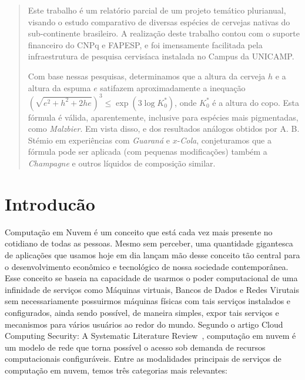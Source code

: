 \documentclass[11pt,twoside]{article}
\begin{document}
\begin{abstract} 
  Este trabalho é um relatório parcial de um projeto temático 
  plurianual, visando o estudo comparativo de diversas espécies de
  cervejas nativas do sub-continente brasileiro.  A realização deste
  trabalho contou com o suporte financeiro do CNPq e FAPESP, e foi
  imensamente facilitada pela infraestrutura de pesquisa cervisíaca
  instalada no Campus da UNICAMP.

  Com base nessas pesquisas, determinamos que a altura da cerveja $h$
  e a altura da espuma $e$ satifazem aproximadamente a inequação
  $(\sqrt{e^2 + h^2 + 2 h e})^3 \leq \exp(3 \log K_0^\ast)$, onde
  $K_0^\ast$ é a altura do copo.  Esta fórmula é válida,
  aparentemente, inclusive para espécies mais pigmentadas, como {\em
  Malzbier}.  Em vista disso, e dos resultados análogos obtidos por
  A. B. Stémio em experiências com {\em Guaraná} e $x$-{\em Cola},
  conjeturamos que a fórmula pode ser aplicada (com pequenas
  modificações) também a {\em Champagne} e outros líquidos de
  composição similar.
\end{abstract}

\section{Introducão}

Computação em Nuvem é um conceito que está cada vez mais presente no cotidiano de todas as pessoas. Mesmo sem perceber, uma quantidade gigantesca de aplicações que usamos hoje 
em dia lançam mão desse conceito tão central para o desenvolvimento econômico e tecnológico de nossa sociedade contemporânea. Esse conceito se baseia na capacidade de usarmos o
poder computacional de uma infinidade de serviços como Máquinas virtuais, Bancos de Dados e Redes Virutais sem necessariamente possuirmos máquinas físicas com tais serviços 
instalados e configurados, ainda sendo possível, de maneira simples, expor tais serviços e mecanismos para vários usuários ao redor do mundo. Segundo o artigo Cloud Computing Security: A
Systematic Literature Review~\cite{UPP}, computação em nuvem é um modelo de rede que torna possível o acesso sob demanda de recursos computacionais configuráveis.
Entre as modalidades principais de serviços de computação em nuvem, temos três categorias mais relevantes:
\end{document}
